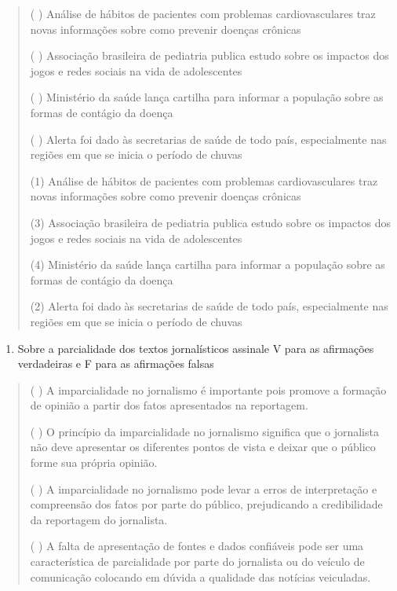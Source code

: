 {\begin{quote}
( ) Análise de hábitos de pacientes com problemas cardiovasculares traz
novas informações sobre como prevenir doenças crônicas

( ) Associação brasileira de pediatria publica estudo sobre os impactos
dos jogos e redes sociais na vida de adolescentes

( ) Ministério da saúde lança cartilha para informar a população sobre
as formas de contágio da doença

( ) Alerta foi dado às secretarias de saúde de todo país, especialmente
nas regiões em que se inicia o período de chuvas

(1) Análise de hábitos de pacientes com problemas cardiovasculares traz
novas informações sobre como prevenir doenças crônicas

(3) Associação brasileira de pediatria publica estudo sobre os impactos
dos jogos e redes sociais na vida de adolescentes

(4) Ministério da saúde lança cartilha para informar a população sobre
as formas de contágio da doença

(2) Alerta foi dado às secretarias de saúde de todo país, especialmente
nas regiões em que se inicia o período de chuvas
\end{quote}

\begin{enumerate}
\def\labelenumi{\arabic{enumi})}
\setcounter{enumi}{5}
\tightlist
\item
  Sobre a parcialidade dos textos jornalísticos assinale V para as
  afirmações verdadeiras e F para as afirmações falsas
\end{enumerate}

\begin{quote}
( ) A imparcialidade no jornalismo é importante pois promove a formação
de opinião a partir dos fatos apresentados na reportagem.

( ) O princípio da imparcialidade no jornalismo significa que o
jornalista não deve apresentar os diferentes pontos de vista e deixar
que o público forme sua própria opinião.

( ) A imparcialidade no jornalismo pode levar a erros de interpretação e
compreensão dos fatos por parte do público, prejudicando a credibilidade
da reportagem do jornalista.

( ) A falta de apresentação de fontes e dados confiáveis pode ser uma
característica de parcialidade por parte do jornalista ou do veículo de
comunicação colocando em dúvida a qualidade das notícias veiculadas.


\end{quote}}
